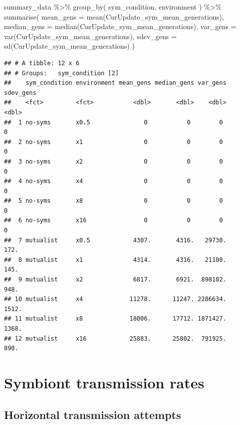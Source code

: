 \documentclass[
]{book}
\newenvironment{Shaded}{\begin{snugshade}}{\end{snugshade}}
\newcommand{\AttributeTok}[1]{\textcolor[rgb]{0.77,0.63,0.00}{#1}}
\newcommand{\FunctionTok}[1]{\textcolor[rgb]{0.00,0.00,0.00}{#1}}
\newcommand{\NormalTok}[1]{#1}
\newcommand{\SpecialCharTok}[1]{\textcolor[rgb]{0.00,0.00,0.00}{#1}}
\begin{document}
\begin{Shaded}
\begin{Highlighting}[]
\NormalTok{summary\_data }\SpecialCharTok{\%\textgreater{}\%}
  \FunctionTok{group\_by}\NormalTok{(}
\NormalTok{    sym\_condition,}
\NormalTok{    environment}
\NormalTok{  ) }\SpecialCharTok{\%\textgreater{}\%}
  \FunctionTok{summarise}\NormalTok{(}
    \AttributeTok{mean\_gens =} \FunctionTok{mean}\NormalTok{(CurUpdate\_sym\_mean\_generations),}
    \AttributeTok{median\_gens =} \FunctionTok{median}\NormalTok{(CurUpdate\_sym\_mean\_generations),}
    \AttributeTok{var\_gens =} \FunctionTok{var}\NormalTok{(CurUpdate\_sym\_mean\_generations),}
    \AttributeTok{sdev\_gens =} \FunctionTok{sd}\NormalTok{(CurUpdate\_sym\_mean\_generations)}
\NormalTok{  )}
\end{Highlighting}
\end{Shaded}

\begin{verbatim}
## # A tibble: 12 x 6
## # Groups:   sym_condition [2]
##    sym_condition environment mean_gens median_gens var_gens sdev_gens
##    <fct>         <fct>           <dbl>       <dbl>    <dbl>     <dbl>
##  1 no-syms       x0.5               0           0        0         0 
##  2 no-syms       x1                 0           0        0         0 
##  3 no-syms       x2                 0           0        0         0 
##  4 no-syms       x4                 0           0        0         0 
##  5 no-syms       x8                 0           0        0         0 
##  6 no-syms       x16                0           0        0         0 
##  7 mutualist     x0.5            4307.       4316.   29730.      172.
##  8 mutualist     x1              4314.       4316.   21100.      145.
##  9 mutualist     x2              6817.       6921.  898102.      948.
## 10 mutualist     x4             11278.      11247. 2286634.     1512.
## 11 mutualist     x8             18006.      17712. 1871427.     1368.
## 12 mutualist     x16            25883.      25802.  791925.      890.
\end{verbatim}

\hypertarget{symbiont-transmission-rates-2}{%
\section{Symbiont transmission rates}\label{symbiont-transmission-rates-2}}

\hypertarget{horizontal-transmission-attempts-2}{%
\subsection{Horizontal transmission attempts}\label{horizontal-transmission-attempts-2}}
\end{document}
